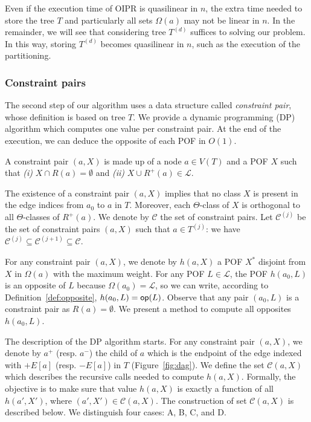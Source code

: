 \documentclass[a4paper,UKenglish,numberwithinsect,cleveref, autoref,anonymous]{lipics-v2021}
\newcommand{\opp}{\mbox{\textsf{op}}}
\begin{document}
Even if the execution time of OIPR is quasilinear in $n$, the extra time needed to store the tree $T$ and particularly all sets $\Omega(a)$ may not be linear in $n$. In the remainder, we will see that considering tree $T^{(d)}$ suffices to solving our problem. In this way, storing $T^{(d)}$ becomes quasilinear in $n$, such as the execution of the partitioning.

\subsubsection{Constraint pairs} \label{subsubsec:cp}

The second step of our algorithm uses a data structure called \textit{constraint pair}, whose definition is based on tree $T$. We provide a dynamic programming (DP) algorithm which computes one value per constraint pair. At the end of the execution, we can deduce the opposite of each POF in $O(1)$.

\begin{definition}
A constraint pair $(a,X)$ is made up of a node $a \in V(T)$ and a POF $X$ such that {\em (i)} $X \cap R(a) = \emptyset$ and {\em (ii)} $X \cup R^+(a) \in \mathcal{L}$.
\label{def:cp}
\end{definition}

The existence of a constraint pair $(a,X)$ implies that no class $X$ is present in the edge indices from $a_0$ to $a$ in $T$. Moreover, each $\Theta$-class of $X$ is orthogonal to all $\Theta$-classes of $R^+(a)$. We denote by $\mathcal{C}$ the set of constraint pairs. Let $\mathcal{C}^{(j)}$ be the set of constraint pairs $(a,X)$ such that $a\in T^{(j)}$: we have $\mathcal{C}^{(j)} \subseteq \mathcal{C}^{(j+1)} \subseteq \mathcal{C}$.

For any constraint pair $(a,X)$, we denote by $h(a,X)$ a POF $X^*$ disjoint from $X$ in $\Omega(a)$ with the maximum weight. For any POF $L \in \mathcal{L}$, the POF $h(a_0,L)$ is an opposite of $L$ because $\Omega(a_0) = \mathcal{L}$, so we can write, according to Definition~\ref{def:opposite}, $h(a_0,L) = \opp(L)$. Observe that any pair $(a_0,L)$ is a constraint pair as $R(a) = \emptyset$. We present a method to compute all opposites $h(a_0,L)$.

The description of the DP algorithm starts. For any constraint pair $(a,X)$, we denote by $a^+$ (resp. $a^-$) the child of $a$ which is the endpoint of the edge indexed with $+E\left[a\right]$ (resp. $-E\left[a\right]$) in $T$ (Figure~\ref{fig:dag}). 
We define the set $\mathcal{C}(a,X)$ which describes the recursive calls needed to compute $h(a,X)$. Formally, the objective is to make sure that value $h(a,X)$ is exactly a function of all $h(a',X')$, where $(a',X') \in \mathcal{C}(a,X)$.
The construction of set $\mathcal{C}(a,X)$ is described below. We distinguish four cases: A, B, C, and D.
\end{document}
